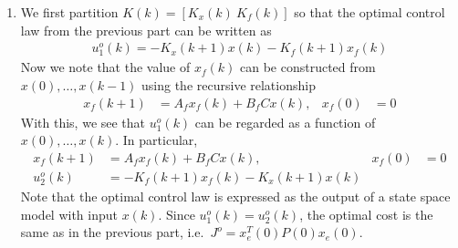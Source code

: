 \begin{enumerate}
\item
We first partition $K(k) = [K_x(k) \ K_f(k)]$ so that the optimal control law from the previous part can be written as
\begin{align*}
    u_1^o(k) = -K_x(k+1) x(k) - K_f(k+1) x_f(k)
\end{align*}
Now we note that the value of $x_f(k)$ can be constructed from $x(0),\ldots,x(k-1)$ using the recursive relationship
\begin{align*}
    x_f(k+1) & = A_f x_f(k) + B_f C x(k),
        & x_f(0) & = 0
\end{align*}
With this, we see that $u_1^o(k)$ can be regarded as a function of $x(0),\ldots,x(k)$. In particular,
\begin{align*}
    x_f(k+1) & = A_f x_f(k) + B_f C x(k),
        & x_f(0) & = 0 \\
    u_2^o(k) & = -K_f(k+1) x_f(k) - K_x(k+1) x(k)
\end{align*}
Note that the optimal control law is expressed as the output of a state space model with input $x(k)$. Since $u_1^o(k) = u_2^o(k)$, the optimal cost is the same as in the previous part, i.e.\ $J^o = x_e^T(0) P(0) x_e(0)$.

\end{enumerate}


